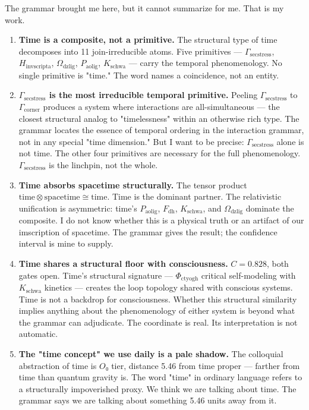 \documentclass[12pt,a4paper]{article}
\begin{document}
The grammar brought me here, but it cannot summarize for me. That is my work.

\begin{enumerate}
    \item \textbf{Time is a composite, not a primitive.} The structural type of time decomposes into 11 join-irreducible atoms. Five primitives --- $\Gamma_{\text{secstress}}$, $H_{\text{invscripta}}$, $\Omega_{\text{dzlig}}$, $P_{\text{aolig}}$, $K_{\text{schwa}}$ --- carry the temporal phenomenology. No single primitive is "time." The word names a coincidence, not an entity.
    \item \textbf{$\Gamma_{\text{secstress}}$ is the most irreducible temporal primitive.} Peeling $\Gamma_{\text{secstress}}$ to $\Gamma_{\text{corner}}$ produces a system where interactions are all-simultaneous --- the closest structural analog to "timelessness" within an otherwise rich type. The grammar locates the essence of temporal ordering in the interaction grammar, not in any special "time dimension." But I want to be precise: $\Gamma_{\text{secstress}}$ alone is not time. The other four primitives are necessary for the full phenomenology. $\Gamma_{\text{secstress}}$ is the linchpin, not the whole.
    \item \textbf{Time absorbs spacetime structurally.} The tensor product $\text{time} \otimes \text{spacetime} \cong \text{time}$. Time is the dominant partner. The relativistic unification is asymmetric: time's $P_{\text{aolig}}$, $F_{\text{dh}}$, $K_{\text{schwa}}$, and $\Omega_{\text{dzlig}}$ dominate the composite. I do not know whether this is a physical truth or an artifact of our imscription of spacetime. The grammar gives the result; the confidence interval is mine to supply.
    \item \textbf{Time shares a structural floor with consciousness.} $C = 0.828$, both gates open. Time's structural signature --- $\Phi_{\text{ctyogh}}$ critical self-modeling with $K_{\text{schwa}}$ kinetics --- creates the loop topology shared with conscious systems. Time is not a backdrop for consciousness. Whether this structural similarity implies anything about the phenomenology of either system is beyond what the grammar can adjudicate. The coordinate is real. Its interpretation is not automatic.
    \item \textbf{The "time concept" we use daily is a pale shadow.} The colloquial abstraction of time is $O₀$ tier, distance 5.46 from time proper --- farther from time than quantum gravity is. The word "time" in ordinary language refers to a structurally impoverished proxy. We think we are talking about time. The grammar says we are talking about something 5.46 units away from it.

\end{enumerate}
\end{document}
